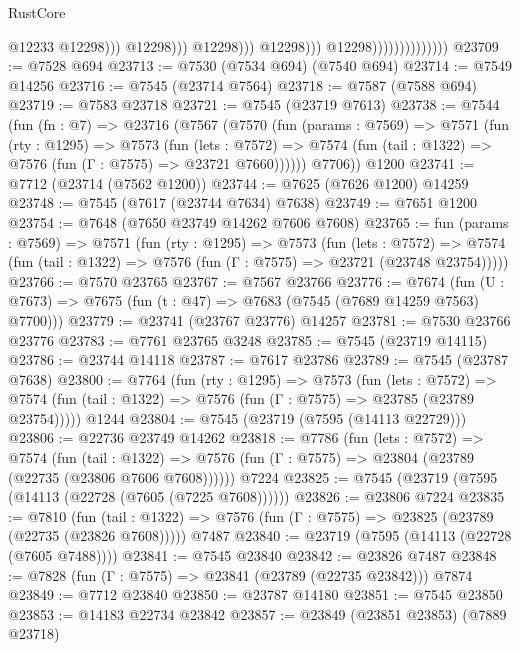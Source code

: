 \begin{lexlean}{RustCore}
\begin{coremodule}
                                                        @12233
                                                        @12298)))
                                                  @12298)))
                                            @12298)))
                                      @12298)))
                                @12298))))))))))))))
@23709 := @7528 @694
@23713 := @7530 (@7534 @694) (@7540 @694)
@23714 := @7549 @14256
@23716 := @7545 (@23714 @7564)
@23718 := @7587 (@7588 @694)
@23719 := @7583 @23718
@23721 := @7545 (@23719 @7613)
@23738 := @7544
    (fun (fn : @7) =>
    @23716
      (@7567
        (@7570
          (fun (params : @7569) =>
          @7571
            (fun (rty : @1295) =>
            @7573
              (fun (lets : @7572) =>
              @7574 (fun (tail : @1322) => @7576 (fun (Γ : @7575) => @23721 @7660))))))
        @7706))
    @1200
@23741 := @7712 (@23714 (@7562 @1200))
@23744 := @7625 (@7626 @1200) @14259
@23748 := @7545 (@7617 (@23744 @7634) @7638)
@23749 := @7651 @1200
@23754 := @7648 (@7650 @23749 @14262 @7606 @7608)
@23765 := fun (params : @7569) =>
  @7571
    (fun (rty : @1295) =>
    @7573
      (fun (lets : @7572) =>
      @7574 (fun (tail : @1322) => @7576 (fun (Γ : @7575) => @23721 (@23748 @23754)))))
@23766 := @7570 @23765
@23767 := @7567 @23766
@23776 := @7674
    (fun (U : @7673) => @7675 (fun (t : @47) => @7683 (@7545 (@7689 @14259 @7563) @7700)))
@23779 := @23741 (@23767 @23776) @14257
@23781 := @7530 @23766 @23776
@23783 := @7761 @23765 @3248
@23785 := @7545 (@23719 @14115)
@23786 := @23744 @14118
@23787 := @7617 @23786
@23789 := @7545 (@23787 @7638)
@23800 := @7764
    (fun (rty : @1295) =>
    @7573
      (fun (lets : @7572) =>
      @7574 (fun (tail : @1322) => @7576 (fun (Γ : @7575) => @23785 (@23789 @23754)))))
    @1244
@23804 := @7545 (@23719 (@7595 (@14113 @22729)))
@23806 := @22736 @23749 @14262
@23818 := @7786
    (fun (lets : @7572) =>
    @7574
      (fun (tail : @1322) =>
      @7576 (fun (Γ : @7575) => @23804 (@23789 (@22735 (@23806 @7606 @7608))))))
    @7224
@23825 := @7545 (@23719 (@7595 (@14113 (@22728 (@7605 (@7225 @7608))))))
@23826 := @23806 @7224
@23835 := @7810
    (fun (tail : @1322) => @7576 (fun (Γ : @7575) => @23825 (@23789 (@22735 (@23826 @7608)))))
    @7487
@23840 := @23719 (@7595 (@14113 (@22728 (@7605 @7488))))
@23841 := @7545 @23840
@23842 := @23826 @7487
@23848 := @7828 (fun (Γ : @7575) => @23841 (@23789 (@22735 @23842))) @7874
@23849 := @7712 @23840
@23850 := @23787 @14180
@23851 := @7545 @23850
@23853 := @14183 @22734 @23842
@23857 := @23849 (@23851 @23853) (@7889 @23718)

\end{coremodule}
\end{lexlean}
